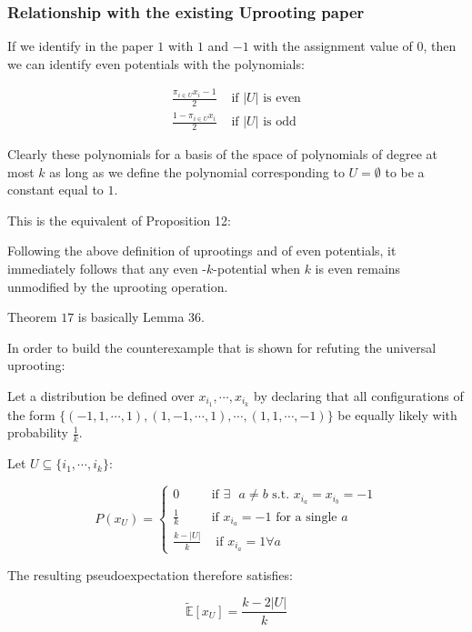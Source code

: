 \subsubsection{ Relationship with the existing Uprooting paper }

If we identify in the paper $1$ with $1$ and $-1$ with the assignment value of $0$, then we can identify even potentials with the polynomials:

\begin{align}
\frac{ \pi_{i \in U} x_i - 1  }{2} & \text{ if }  |U| \text{ is even}\\
\frac{ 1- \pi_{i\in U} x_i}{2} & \text{ if } |U| \text{ is odd}
\end{align}

Clearly these polynomials for a basis of the space of polynomials of degree at most $k$ as long as we define the polynomial corresponding to $U = \emptyset$ to be a constant equal to $1$. 

This is the equivalent of Proposition 12:

Following the above definition of uprootings and of even potentials, it immediately follows that any even -$k$-potential when $k$ is even remains unmodified by the uprooting operation. 

Theorem $17$ is basically Lemma 36. 

In order to build the counterexample that is shown for refuting the universal uprooting:

Let a distribution be defined over $x_{i_1}, \cdots, x_{i_k}$ by declaring that all configurations of the form $\{( - 1, 1, \cdots, 1), (  1, -1, \cdots, 1), \cdots, ( 1, 1, \cdots, -1)\}$ be equally likely with probability $\frac{1}{k}$. 

Let $U \subseteq \{ i_1, \cdots, i_k\} $:

\begin{equation}
P(x_U) = \begin{cases}
		0 & \text{if } \exists\text{ } a\neq b \text{ s.t. } x_{i_a} = x_{i_b} = -1\\
        \frac{1}{k} & \text{if } x_{i_a} = -1 \text{ for a single } a\\
        \frac{k-|U|}{k} & \text{ if } x_{i_a} = 1 \forall a
		\end{cases}
\end{equation}


The resulting pseudoexpectation therefore satisfies:

\begin{equation}
\tilde{\mathbb{E}}[x_U] = \frac{k-2|U|}{k}
\end{equation}



